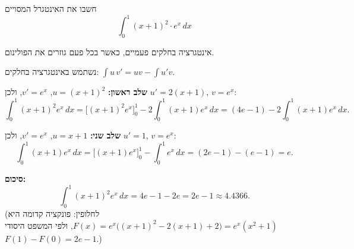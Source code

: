 
\begin{question}
חשבו את האינטגרל המסויים
\[ \int_0^1 (x+1)^2\cdot e^x\,dx \]
\end{question}

\begin{hint}
אינטגרציה בחלקים פעמיים, כאשר בכל פעם גוזרים את הפולינום.
\end{hint}

\begin{solution}
נשתמש באינטגרציה בחלקים: $\int u\,v'=uv-\int u'v$.

\textbf{שלב ראשון:} $u=(x+1)^2$, $v'=e^x$, ולכן $u'=2(x+1)$, $v=e^x$:
\[ \int_0^1(x+1)^2e^x\,dx=\Big[(x+1)^2e^x\Big]_0^1-2\int_0^1(x+1)e^x\,dx=(4e-1)-2\int_0^1(x+1)e^x\,dx. \]

\textbf{שלב שני:} $u=x+1$, $v'=e^x$, ולכן $u'=1$, $v=e^x$:
\[ \int_0^1(x+1)e^x\,dx=\Big[(x+1)e^x\Big]_0^1-\int_0^1e^x\,dx=(2e-1)-(e-1)=e. \]

\textbf{סיכום:}
\[ \int_0^1(x+1)^2e^x\,dx=4e-1-2e=\boxed{2e-1}\approx 4.4366. \]
(לחלופין: פונקציה קדומה היא $F(x)=e^x\big((x+1)^2-2(x+1)+2\big)=e^x(x^2+1)$, ולפי המשפט היסודי $F(1)-F(0)=2e-1$.)
\end{solution}
